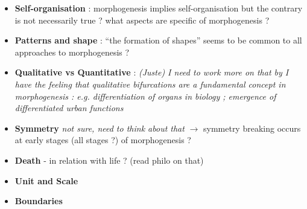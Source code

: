 \documentclass{article}
\begin{document}





%


\begin{itemize}
\item \textbf{Self-organisation} : morphogenesis implies self-organisation but the contrary is not necessarily true ? what aspects are specific of morphogenesis ? 
\item \textbf{Patterns and shape} : ``the formation of shapes'' seems to be common to all approaches to morphogenesis ?
\item \textbf{Qualitative vs Quantitative} : \textit{(Juste) I need to work more on that by I have the feeling that qualitative bifurcations are a fundamental concept in morphogenesis : e.g. differentiation of organs in biology ; emergence of differentiated urban functions}
\item \textbf{Symmetry} \textit{not sure, need to think about that} $\rightarrow$ symmetry breaking occurs at early stages (all stages ?) of morphogenesis ?
\item \textbf{Death} - in relation with life ? (read philo on that)
\item \textbf{Unit and Scale}
\item \textbf{Boundaries}
\end{itemize}







\end{document}
